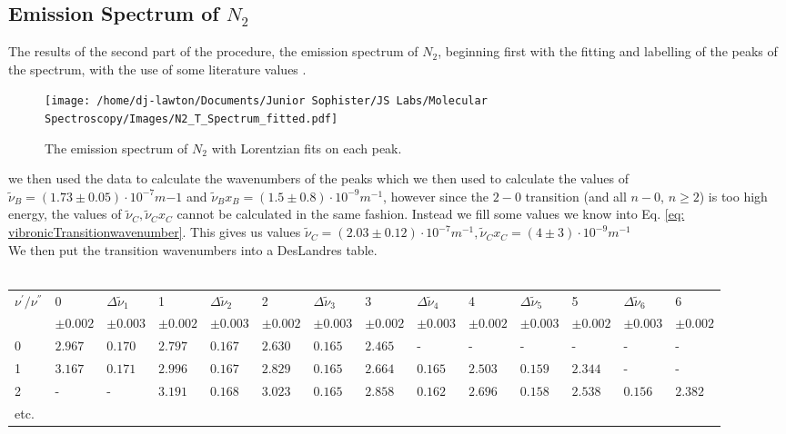 \documentclass{article}
\begin{document}
\subsection{Emission Spectrum of $N_2$}
The results of the second part of the procedure, the emission spectrum of $N_2$, beginning first with the fitting and labelling of the peaks of the spectrum, with the use of some literature values \cite{article3}.\\
\begin{figure}[H]
    \centering
    \texttt{[image: /home/dj-lawton/Documents/Junior Sophister/JS Labs/Molecular Spectroscopy/Images/N2\_T\_Spectrum\_fitted.pdf]}
    \caption{\label{fig:N2Emission} The emission spectrum of $N_2$ with Lorentzian fits on each peak.}
\end{figure}
we then used the data to calculate the wavenumbers of the peaks which we then used to calculate the values of $\tilde{\nu}_B = (1.73\pm0.05)\cdot10^{-7} m{-1} $ and $\tilde{\nu}_Bx_B = (1.5\pm0.8)\cdot10^{-9}m^{-1}$, however since the $2-0$ transition (and all $n-0$, $n\geq2$) is too high energy, the values of $\tilde{\nu}_C, \tilde{\nu}_Cx_C$ cannot be calculated in the same fashion. Instead we fill some values we know into Eq. \ref{eq: vibronicTransitionwavenumber}. This gives us values $\tilde{\nu}_C=(2.03\pm0.12)\cdot10^{-7} m^{-1}, \tilde{\nu}_Cx_C=(4\pm3)\cdot10^{-9} m^{-1}$\\
\indent We then put the transition wavenumbers into a DesLandres table.\\
\vspace{0.5cm}\\
\begin{tabular}{p{}|p{}|p{}|p{}|p{}|p{}|p{}|p{}|p{}|p{}|p{}|p{}|p{}|p{}|}
    \hline
    \hline
    $\nu^{\prime}/\nu^{''}$ & 0 & $\Delta\tilde{\nu}_1$ & 1 & $\Delta\tilde{\nu}_2$ & 2 & $\Delta\tilde{\nu}_3$ & 3 & $\Delta\tilde{\nu}_4$ & 4 & $\Delta\tilde{\nu}_5$ & 5 & $\Delta\tilde{\nu}_6$ & 6\\
    ~ & $\pm0.002$ & $\pm0.003$ & $\pm0.002$ & $\pm0.003$ & $\pm0.002$ & $\pm0.003$ & $\pm0.002$ & $\pm0.003$ & $\pm0.002$ & $\pm0.003$ & $\pm0.002$ & $\pm0.003$ & $\pm0.002$ \\ 
    \hline
    0 & $2.967$ & $0.170$ & $2.797$ & $0.167$ & $2.630$ & $0.165$ & $2.465$ & - & - & - & - & - & -\\
    \hline
    1 & $3.167$ & $0.171$ & $2.996$ & $0.167$ & $2.829$ & $0.165$ & $2.664$ & $0.165$ & $2.503$ & $0.159$ & $2.344$&-&-\\
    \hline
    2 & - & - & $3.191$ & $0.168$ & $3.023$ & $0.165$ & $2.858$ & $0.162$ & $2.696$ & $0.158$ & $2.538$ & $0.156$ & $2.382$ \\ 
    etc. \\
    \hline
    \hline
    
\end{tabular}
\end{document}
